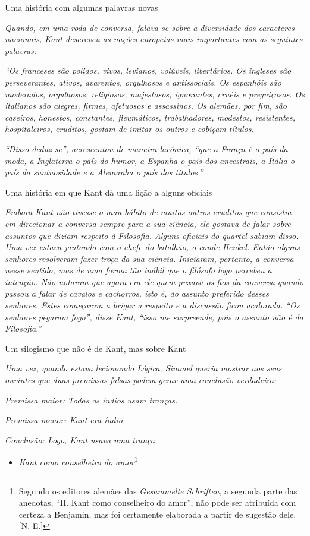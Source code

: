 Uma história com algumas palavras novas

\emph{Quando, em uma roda de conversa, falava-se sobre a diversidade dos
caracteres nacionais, Kant descreveu as nações europeias mais
importantes com as seguintes palavras:}

\emph{``Os franceses são polidos, vivos, levianos, volúveis,
libertários. Os ingleses são perseverantes, ativos, avarentos,
orgulhosos e antissociais. Os espanhóis são moderados, orgulhosos,
religiosos, majestosos, ignorantes, cruéis e preguiçosos. Os italianos
são alegres, firmes, afetuosos e assassinos. Os alemães, por fim, são
caseiros, honestos, constantes, fleumáticos, trabalhadores, modestos,
resistentes, hospitaleiros, eruditos, gostam de imitar os outros e
cobiçam títulos.}

\emph{``Disso deduz-se'', acrescentou de maneira lacônica, ``que a
França é o país da moda, a Inglaterra o país do humor, a Espanha o país
dos ancestrais, a Itália o país da suntuosidade e a Alemanha o país dos
títulos.''}

Uma história em que Kant dá uma lição a alguns oficiais

\emph{Embora Kant não tivesse o mau hábito de muitos outros eruditos que
consistia em direcionar a conversa sempre para a sua ciência, ele
gostava de falar sobre assuntos que diziam respeito à Filosofia. Alguns
oficiais do quartel sabiam disso. Uma vez estava jantando com o chefe do
batalhão, o conde Henkel. Então alguns senhores resolveram fazer troça
da sua ciência. Iniciaram, portanto, a conversa nesse sentido, mas de
uma forma tão inábil que o filósofo logo percebeu a intenção. Não
notaram que agora era ele quem puxava os fios da conversa quando passou
a falar de cavalos e cachorros, isto é, do assunto preferido desses
senhores. Estes começaram a brigar a respeito e a discussão ficou
acalorada. ``Os senhores pegaram fogo'', disse Kant, ``isso me
surpreende, pois o assunto não é da Filosofia.''}

Um silogismo que não é de Kant, mas sobre Kant

\emph{Uma vez, quando estava lecionando Lógica, Simmel queria mostrar
aos seus ouvintes que duas premissas falsas podem gerar uma conclusão
verdadeira:}

\emph{Premissa maior: Todos os índios usam tranças.}

\emph{Premissa menor: Kant era índio.}

\emph{Conclusão: Logo, Kant usava uma trança.}

\begin{itemize}
\item
  \emph{Kant como conselheiro do amor}\footnote{Segundo os editores
    alemães das \emph{Gesammelte Schriften}, a segunda parte das
    anedotas, ``II. Kant como conselheiro do amor'', não pode ser
    atribuída com certeza a Benjamin, mas foi certamente elaborada a
    partir de sugestão dele. {[}N. E.{]}}
\end{itemize}

